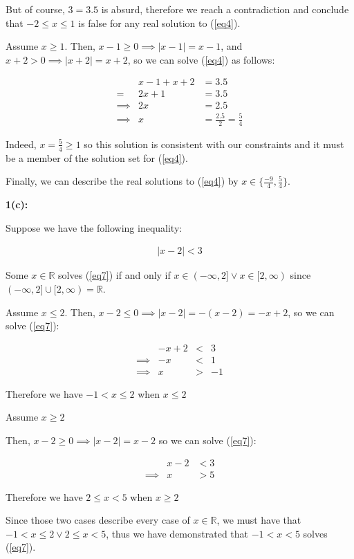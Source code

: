 \documentclass{article}
\newcommand{\reals}{\mathbb{R}}
\begin{document}
But of course, $3 = 3.5$ is absurd,
therefore we reach a contradiction
and conclude that $-2 \le x \le 1$ is false for any real solution to (\ref{eq4}).

Assume $x \geq 1$.
Then, $x-1 \geq 0 \implies |x-1| = x-1$,
and $x+2 > 0 \implies |x+2| = x+2$,
so we can solve (\ref{eq4}) as follows:

\begin{align}
	& x-1 +x+2 & = 3.5 \\
	= & 2x+1 & = 3.5 \\
	\implies & 2x & = 2.5 \\
	\label{eq6} \implies & x & = \frac{2.5}{2} = \frac{5}{4}
\end{align}

Indeed, $x = \frac{5}{4} \geq 1$ so this solution is consistent
with our constraints and it must be a member of the solution set for (\ref{eq4}).

Finally, we can describe the real solutions
to (\ref{eq4}) by $x \in \{ \frac{-9}{4}, \frac{5}{4} \}$.

\medskip
\textbf{1(c):}

Suppose we have the following inequality: 

\begin{align} \label{eq7}
	|x-2| < 3
\end{align}

Some $x \in \reals$ solves (\ref{eq7}) if and only if
$x \in (-\infty,2] \lor x \in [2, \infty)$
since $(-\infty,2] \cup [2,\infty) = \reals$.


Assume $x \le 2$.
Then, $x - 2 \le 0 \implies |x-2| = -(x-2) = -x+2$,
so we can solve (\ref{eq7}):

\begin{align}
	&-x+2 &< &3 \\
	\implies &-x &< &1 \\
	\implies &x & > &-1
\end{align}

Therefore we have $-1 < x \le 2$ when $x \le 2$

Assume $x \geq 2$

Then, $x - 2 \geq 0 \implies |x-2| = x-2$
so we can solve (\ref{eq7}):

\begin{align}
	&x-2 &< 3 \\
	\implies &x &> 5
\end{align}

Therefore we have $2 \le x < 5$ when $x \geq 2$

Since those two cases describe every case of $x \in \reals$,
we must have that $-1 < x \le 2 \lor 2 \le x < 5$,
thus we have demonstrated that $-1 < x < 5$ solves (\ref{eq7}).
\end{document}
